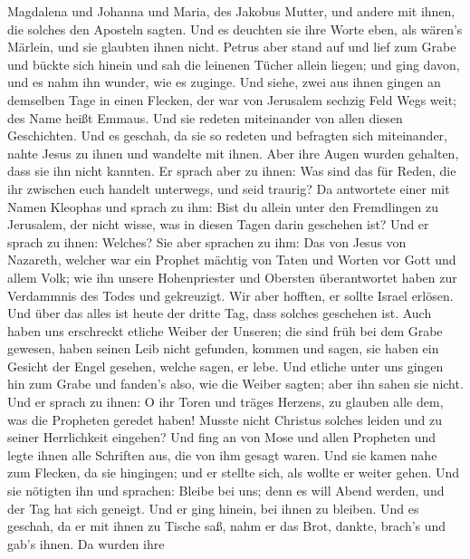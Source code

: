 Magdalena und Johanna und Maria, des Jakobus Mutter, und andere mit
ihnen, die solches den Aposteln sagten.  Und es deuchten
sie ihre Worte eben, als wären's Märlein, und sie glaubten ihnen nicht.
 Petrus aber stand auf und lief zum Grabe und bückte sich
hinein und sah die leinenen Tücher allein liegen; und ging davon, und es
nahm ihn wunder, wie es zuginge.  Und siehe, zwei aus ihnen
gingen an demselben Tage in einen Flecken, der war von Jerusalem sechzig
Feld Wegs weit; des Name heißt Emmaus.  Und sie redeten
miteinander von allen diesen Geschichten.  Und es geschah,
da sie so redeten und befragten sich miteinander, nahte Jesus zu ihnen
und wandelte mit ihnen.  Aber ihre Augen wurden gehalten,
dass sie ihn nicht kannten.  Er sprach aber zu ihnen: Was
sind das für Reden, die ihr zwischen euch handelt unterwegs, und seid
traurig?  Da antwortete einer mit Namen Kleophas und sprach
zu ihm: Bist du allein unter den Fremdlingen zu Jerusalem, der nicht
wisse, was in diesen Tagen darin geschehen ist?  Und er
sprach zu ihnen: Welches? Sie aber sprachen zu ihm: Das von Jesus von
Nazareth, welcher war ein Prophet mächtig von Taten und Worten vor Gott
und allem Volk;  wie ihn unsere Hohenpriester und Obersten
überantwortet haben zur Verdammnis des Todes und gekreuzigt.
 Wir aber hofften, er sollte Israel erlösen. Und über das
alles ist heute der dritte Tag, dass solches geschehen ist.
 Auch haben uns erschreckt etliche Weiber der Unseren; die
sind früh bei dem Grabe gewesen,  haben seinen Leib nicht
gefunden, kommen und sagen, sie haben ein Gesicht der Engel gesehen,
welche sagen, er lebe.  Und etliche unter uns gingen hin
zum Grabe und fanden's also, wie die Weiber sagten; aber ihn sahen sie
nicht.  Und er sprach zu ihnen: O ihr Toren und träges
Herzens, zu glauben alle dem, was die Propheten geredet haben!
 Musste nicht Christus solches leiden und zu seiner
Herrlichkeit eingehen?  Und fing an von Mose und allen
Propheten und legte ihnen alle Schriften aus, die von ihm gesagt waren.
 Und sie kamen nahe zum Flecken, da sie hingingen; und er
stellte sich, als wollte er weiter gehen.  Und sie nötigten
ihn und sprachen: Bleibe bei uns; denn es will Abend werden, und der Tag
hat sich geneigt. Und er ging hinein, bei ihnen zu bleiben.
 Und es geschah, da er mit ihnen zu Tische saß, nahm er das
Brot, dankte, brach's und gab's ihnen.  Da wurden ihre
